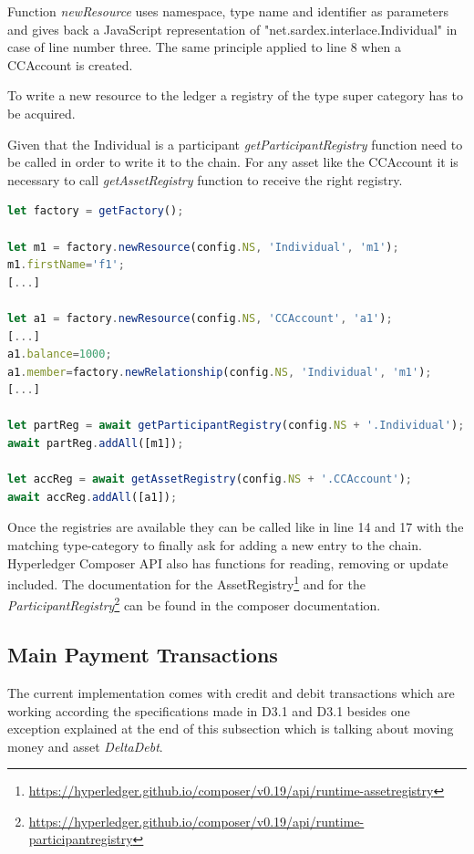 Function \textit{newResource} uses namespace, type name and identifier as parameters and gives back a JavaScript representation of "net.sardex.interlace.Individual" in case of line number three. The same principle applied to line 8 when a CCAccount is created.

To write a new resource to the ledger a registry of the type super category has to be acquired.

Given that the Individual is a participant \textit{getParticipantRegistry} function need to be called in order to write it to the chain. For any asset like the CCAccount it is necessary to call \textit{getAssetRegistry} function to receive the right registry.

\begin{center}
\begin{minipage}{0.8\textwidth}
\small
\begin{lstlisting}[language=javascript,firstnumber=1,caption={\bf\small chain-code adding a new resource in \textit{initBlockchain} function}, captionpos=b,label=lst:initBlock]
let factory = getFactory();

let m1 = factory.newResource(config.NS, 'Individual', 'm1');
m1.firstName='f1';
[...]

let a1 = factory.newResource(config.NS, 'CCAccount', 'a1');
[...]
a1.balance=1000;
a1.member=factory.newRelationship(config.NS, 'Individual', 'm1');
[...]

let partReg = await getParticipantRegistry(config.NS + '.Individual');
await partReg.addAll([m1]);

let accReg = await getAssetRegistry(config.NS + '.CCAccount');
await accReg.addAll([a1]);
\end{lstlisting}
\end{minipage}
\end{center}

Once the registries are available they can be called like in line 14 and 17 with the matching type-category to finally ask for adding a new entry to the chain. Hyperledger Composer API also has  functions for reading, removing or update included. The documentation for the AssetRegistry\footnote{\url{https://hyperledger.github.io/composer/v0.19/api/runtime-assetregistry}} and for the \textit{ParticipantRegistry}\footnote{\url{https://hyperledger.github.io/composer/v0.19/api/runtime-participantregistry}} can be found in the composer documentation.

\subsection{Main Payment Transactions}
\label{subsec:main-payment-transactions}
The current implementation comes with credit and debit transactions which are working according the specifications made in D3.1 and D3.1 besides one exception explained at the end of this subsection which is talking about moving money and asset \textit{DeltaDebt}.

